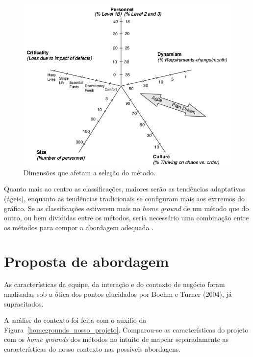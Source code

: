 	\begin{figure}[!htbp]
	  \centering
	  \includegraphics[scale=0.5]{editaveis/figuras/Dimensions_Afecting_Method_Selection}
	  \caption[Dimensões que afetam a seleção do método]{Dimensões que afetam a seleção do método.\footnotemark}
	  \label{five_dimensions}
	\end{figure}
	
	Quanto mais ao centro as classificações, maiores serão as tendências adaptativas (ágeis), enquanto as tendências
	tradicionais se configuram mais aos extremos do gráfico. Se as classificações estiverem mais no \textit{home ground}
	de um método que do outro, ou bem divididas entre os métodos, seria necessário uma combinação entre os métodos para
	compor a abordagem adequada \cite{boehm}.
  
  \pagebreak
  \section{Proposta de abordagem}
    
    As características da equipe, da interação e do contexto de negócio foram analisadas sob a ótica dos pontos elucidados
    por Boehm e Turner (2004), já supracitados.
    
    A análise do contexto foi feita com o auxílio da Figura~\ref{homegrounds_nosso_projeto}. Comparou-se as características do projeto com os \textit{home grounds}
    dos métodos no intuito de mapear separadamente as características do nosso contexto nas possíveis abordagens.
    
